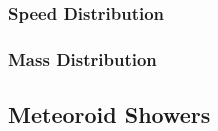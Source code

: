 \documentclass{article}
\begin{document}
\subsubsection{Speed Distribution}


\subsubsection{Mass Distribution}




\subsection{Meteoroid Showers}

	
\end{document}
